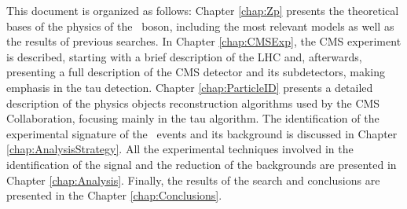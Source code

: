 \noindent This document is organized as follows: Chapter \ref{chap:Zp} presents the theoretical bases of the 
physics of the \Zprime~boson, including the most relevant models as well as the results of previous searches. In 
Chapter \ref{chap:CMSExp}, the CMS experiment is described, starting with a brief description 
of the LHC and, afterwards, presenting a full description of the CMS detector and its 
subdetectors, making emphasis in the tau detection. Chapter \ref{chap:ParticleID}
presents a detailed description of the physics objects reconstruction algorithms used
by the CMS Collaboration, focusing mainly in the tau algorithm. The identification
of the experimental signature of the \Zprimetotauh~events and its background
is discussed in Chapter \ref{chap:AnalysisStrategy}. All the experimental techniques 
involved in the identification of the signal and the reduction of the backgrounds
are presented in Chapter \ref{chap:Analysis}. Finally, the results of the search 
and conclusions are presented in the Chapter \ref{chap:Conclusions}.

